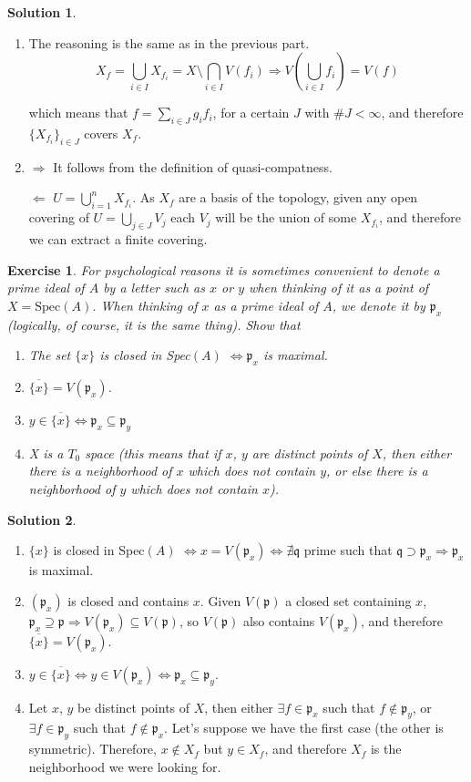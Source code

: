 \documentclass[12pt]{article}
\newcommand{\imp}{\ensuremath{\Rightarrow}}
\newcommand{\ip}{\ensuremath{\mathfrak{p}}}
\newcommand{\iq}{\ensuremath{\mathfrak{q}}}
\newcommand*\closure[1]{\overline{#1}}
\newtheorem{ex}{Exercise}[section]
\theoremstyle{definition}
\newtheorem*{sol}{Solution}
\begin{document}
\begin{sol}
\begin{enumerate}[label=(\roman*)]
		\item The reasoning is the same as in the previous part.
		\[
			X_f = \bigcup_{i \in I} X_{f_i} = X \setminus \bigcap_{i \in I} V(f_i) \imp V(\bigcup_{i \in I} f_i) = V(f)
		\]
		
		which means that $f = \sum_{i \in J} g_i f_i$, for a certain $J$ with $\#J < \infty$, and therefore $\{ X_{f_i} \}_{i \in J}$ covers $X_f$.

		\item $\boxed{\Rightarrow}$ It follows from the definition of quasi-compatness.

		\noindent $\boxed{\Leftarrow}$ $U = \bigcup_{i = 1}^n X_{f_i}$. As $X_f$ are a basis of the topology, given any open covering of $U = \bigcup_{j \in J} V_j$ each $V_j$ will be the union of some $X_{f_i}$, and therefore we can extract a finite covering.
	\end{enumerate}
\end{sol}


\begin{ex}
For psychological reasons it is sometimes convenient to denote a prime ideal of $A$ by a letter such as $x$ or $y$ when thinking of it as a point of $X = \text{Spec}(A)$. When thinking of $x$ as a prime ideal of $A$, we denote it by $\ip_x$ (logically, of course,
it is the same thing). Show that
	\begin{enumerate}[label=(\roman*)]
		\item The set $\{x\}$ is closed in Spec$(A)$ $\iff \ip_x$ is maximal.
		\item $\closure{\{x\}} = V(\ip_x)$.
		\item $y \in \closure{\{x\}} \iff \ip_x \subseteq \ip_y$
		\item X is a $T_0$ space (this means that if $x$, $y$ are distinct points of $X$, then either there is a neighborhood of $x$ which does not contain $y$, or else there is a neighborhood of $y$ which does not contain $x$).
	\end{enumerate}
\end{ex}

\begin{sol}
	\begin{enumerate}[label=(\roman*)]
		\item $\{x\}$ is closed in Spec$(A)$ $\iff x = V(\ip_x) \iff \nexists \iq$ prime such that $\iq \supset \ip_x \imp \ip_x$ is maximal.  
		\item $(\ip_x)$ is closed and contains $x$. Given $V(\ip)$ a closed set containing $x$, $\ip_x \supseteq \ip \imp V(\ip_x) \subseteq V(\ip)$, so $V(\ip)$ also contains $V(\ip_x)$, and therefore $\closure{\{x\}} = V(\ip_x)$.
		\item $y \in \closure{\{x\}} \iff y \in V(\ip_x) \iff \ip_x \subseteq \ip_y$.
		\item Let $x$, $y$ be distinct points of $X$, then either $\exists f \in \ip_x$ such that $f \notin \ip_y$, or $\exists f \in \ip_y$ such that $f \notin \ip_x$. Let's suppose we have the first case (the other is symmetric). Therefore, $x \notin X_f$ but $y \in X_f$, and therefore $X_f$ is the neighborhood we were looking for. 
	\end{enumerate}
\end{sol}
\end{document}
